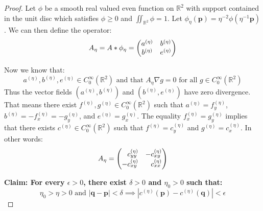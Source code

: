 \documentclass{amsart}
\newcommand{\R}			{\mathbb R}
\newcommand{\p}			{\mathbf p}
\newcommand{\q}			{\mathbf q}
\newcommand{\grad}		{\nabla}
\numberwithin{equation}{section}
\begin{document}
\begin{proof}
Let $\phi$ be a smooth real valued even function on 
$\R^2$ with support contained in the unit disc which satisfies 
$\phi\geq 0$ and $\iint_{\R^2}\phi=1$.  Let 
$\phi_\eta(\p)=\eta^{-2}\phi(\eta^{-1}\p)$.  We can then define 
the operator:
\begin{equation}
A_\eta=A*\phi_\eta=\left(\begin{matrix}
a^{(\eta)}&b^{(\eta)}\cr b^{(\eta)}&e^{(\eta)}\end{matrix}\right)
\end{equation}

Now we know that:
\begin{equation}
a^{(\eta)},b^{(\eta)},e^{(\eta)}\in C_0^\infty(\R^2)\text{ and that 
$A_\eta\grad g=0$ for all $g\in C_0^\infty(\R^2)$}
\end{equation}
Thus the vector fields $(a^{(\eta)},b^{(\eta)})$ and 
$(b^{(\eta)},e^{(\eta)})$ have zero divergence.  That 
means there exist $f^{(\eta)},g^{(\eta)}\in C_0^\infty(\R^2)$ such 
that $a^{(\eta)}=f^{(\eta)}_y$, 
$b^{(\eta)}=-f^{(\eta)}_x=-g^{(\eta)}_y$, and 
$e^{(\eta)}=g^{(\eta)}_x$.  The equality $f^{(\eta)}_x=g^{(\eta)}_y$ implies 
that there exists $c^{(\eta)}\in C_0^\infty(\R^2)$ such 
that $f^{(\eta)}=c^{(\eta)}_y$ and $g^{(\eta)}=c^{(\eta)}_x$.  
In other words:
\begin{equation}
A_\eta=\left(\begin{matrix}\hfill c^{(\eta)}_{yy}&-c^{(\eta)}_{xy}
\cr-c^{(\eta)}_{xy}&\hfill c^{(\eta)}_{xx}\end{matrix}\right)
\end{equation}

{\bf Claim: For every $\epsilon>0$, there exist $\delta>0$ 
and $\eta_0>0$ such that:
\begin{equation}
\eta_0>\eta>0\text{ and }|\q-\p|<\delta\implies|c^{(\eta)}(\p)-c^{(\eta)}(\q)|<\epsilon
\end{equation}}


\end{proof}
\end{document}
